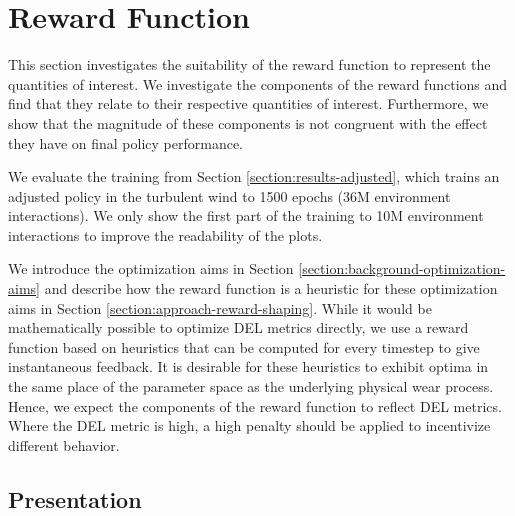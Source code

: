 \section{Reward Function}
\label{section:results-reward}

\begin{summary}
This section investigates the suitability of the reward function to represent the quantities of interest. We investigate the components of the reward functions and find that they relate to their respective quantities of interest. Furthermore, we show that the magnitude of these components is not congruent with the effect they have on final policy performance. 
\end{summary}

We evaluate the training from Section \ref{section:results-adjusted}, which trains an adjusted policy in the turbulent wind to 1500 epochs (36M environment interactions). We only show the first part of the training to 10M environment interactions to improve the readability of the plots.

We introduce the optimization aims in Section \ref{section:background-optimization-aims} and describe how the reward function is a heuristic for these optimization aims in Section \ref{section:approach-reward-shaping}. While it would be mathematically possible to optimize DEL metrics directly, we use a reward function based on heuristics that can be computed for every timestep to give instantaneous feedback. It is desirable for these heuristics to exhibit optima in the same place of the parameter space as the underlying physical wear process. Hence, we expect the components of the reward function to reflect DEL metrics. Where the DEL metric is high, a high penalty should be applied to incentivize different behavior.

\subsection{Presentation}

